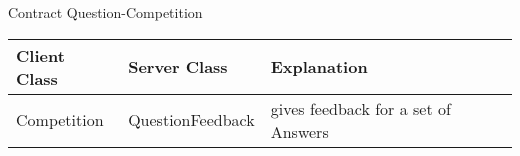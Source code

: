 \begin{subsubsection}{Contract Question-Competition}
	\begin{tabular}{l l l }
	  Client Class & Server Class & Explanation\\ \hline
	  Competition & QuestionFeedback & gives feedback for a set of Answers\\
	\end{tabular}
\end{subsubsection}